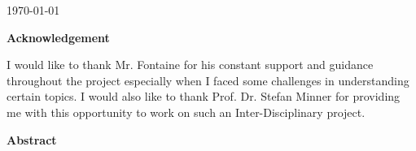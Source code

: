 \documentclass[a4paper, 12pt]{article}
\begin{document}
\begin{titlepage}


{\large \today}\\[2cm] %

\end{titlepage}

\begin{center}
\huge \bfseries Acknowledgement
\end{center}

\vspace{35mm}
I would like to thank Mr. Fontaine for his constant support and guidance throughout the project especially when I faced some challenges in understanding certain topics. I would also like to thank Prof. Dr. Stefan Minner for providing me with this opportunity to work on such an Inter-Disciplinary project.

\newpage

\begin{center}
\huge \bfseries Abstract
\end{center}

\vspace{35mm}
\end{document}
